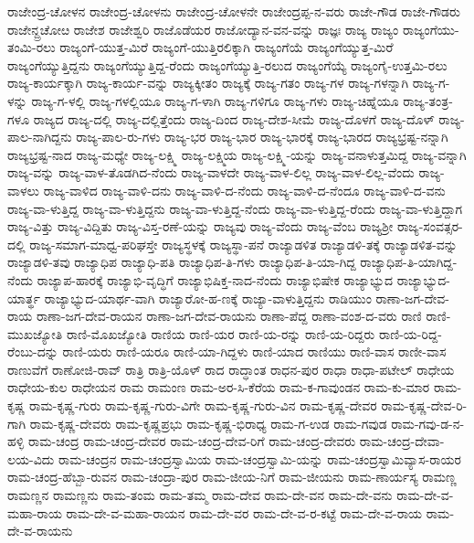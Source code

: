 ರಾಜೇಂದ್ರ-ಚೋಳನ
ರಾಜೇಂದ್ರ-ಚೋಳನು
ರಾಜೇಂದ್ರ-ಚೋಳನೇ
ರಾಜೇಂದ್ರಪ್ಪ-ನ-ವರು
ರಾಜೇ-ಗೌಡ
ರಾಜೇ-ಗೌಡರು
ರಾಜೇನ್ದ್ರಚೋೞ
ರಾಜೇಶ
ರಾಜೇಶ್ವರಿ
ರಾಜೊಡೆಯರ
ರಾಜೋದ್ಯಾನ-ವನ-ವನ್ನು
ರಾಜ್ಞಃ
ರಾಜ್ಯ
ರಾಜ್ಯಂ
ರಾಜ್ಯಂಗೆಯು-ತಂಮಿ-ರಲು
ರಾಜ್ಯಂಗೆ-ಯುತ್ತ-ಮಿರೆ
ರಾಜ್ಯಂಗೆ-ಯುತ್ತಿರಲಿಕ್ಕಾಗಿ
ರಾಜ್ಯಂಗೆಯೆ
ರಾಜ್ಯಂಗೆಯ್ಯುತ್ತ-ಮಿರೆ
ರಾಜ್ಯಂಗೆಯ್ಯುತ್ತಿದ್ದನು
ರಾಜ್ಯಂಗೆಯ್ಯುತ್ತಿದ್ದ-ರೆಂದು
ರಾಜ್ಯಂಗೆಯ್ಯುತ್ತಿ-ರಲುದ
ರಾಜ್ಯಂಗೆಯ್ಯೆ
ರಾಜ್ಯಂಗೈ-ಉತ್ತಮಿ-ರಲು
ರಾಜ್ಯ-ಕಾರ್ಯಕ್ಕಾಗಿ
ರಾಜ್ಯ-ಕಾರ್ಯ-ವನ್ನು
ರಾಜ್ಯಕ್ಕೀತಂ
ರಾಜ್ಯಕ್ಕೆ
ರಾಜ್ಯ-ಗತಂ
ರಾಜ್ಯ-ಗಳ
ರಾಜ್ಯ-ಗಳನ್ನಾಗಿ
ರಾಜ್ಯ-ಗ-ಳನ್ನು
ರಾಜ್ಯ-ಗ-ಳಲ್ಲಿ
ರಾಜ್ಯ-ಗಳಲ್ಲಿಯೂ
ರಾಜ್ಯ-ಗ-ಳಾಗಿ
ರಾಜ್ಯ-ಗಳಿಗೂ
ರಾಜ್ಯ-ಗಳು
ರಾಜ್ಯ-ಚಿಹ್ನೆಯೂ
ರಾಜ್ಯ-ತಂತ್ರ-ಗಳೂ
ರಾಜ್ಯದ
ರಾಜ್ಯ-ದಲ್ಲಿ
ರಾಜ್ಯ-ದಲ್ಲಿತ್ತೆಂದು
ರಾಜ್ಯ-ದಿಂದ
ರಾಜ್ಯ-ದೇಶ-ಸೀಮೆ
ರಾಜ್ಯ-ದೊಳಗೆ
ರಾಜ್ಯ-ದೊಳ್
ರಾಜ್ಯ-ಪಾಲ-ನಾಗಿದ್ದನು
ರಾಜ್ಯ-ಪಾಲ-ರು-ಗಳು
ರಾಜ್ಯ-ಭರ
ರಾಜ್ಯ-ಭಾರ
ರಾಜ್ಯ-ಭಾರಕ್ಕೆ
ರಾಜ್ಯ-ಭಾರದ
ರಾಜ್ಯಭ್ರಷ್ಟ-ನನ್ನಾಗಿ
ರಾಜ್ಯಭ್ರಷ್ಟ-ನಾದ
ರಾಜ್ಯ-ಮಧ್ಯೇ
ರಾಜ್ಯ-ಲಕ್ಷ್ಮಿ
ರಾಜ್ಯ-ಲಕ್ಷ್ಮಿಯ
ರಾಜ್ಯ-ಲಕ್ಷ್ಮಿ-ಯನ್ನು
ರಾಜ್ಯ-ವನಾಳುತ್ತಮಿದ್ದ
ರಾಜ್ಯ-ವನ್ನಾಗಿ
ರಾಜ್ಯ-ವನ್ನು
ರಾಜ್ಯ-ವಾಳ-ತೊಡಗಿದ-ನೆಂದು
ರಾಜ್ಯ-ವಾಳದೇ
ರಾಜ್ಯ-ವಾಳ-ಲಿಲ್ಲ
ರಾಜ್ಯ-ವಾಳ-ಲಿಲ್ಲ-ವೆಂದು
ರಾಜ್ಯ-ವಾಳಲು
ರಾಜ್ಯ-ವಾಳಿದ
ರಾಜ್ಯ-ವಾಳಿ-ದನು
ರಾಜ್ಯ-ವಾಳಿ-ದ-ನೆಂದು
ರಾಜ್ಯ-ವಾಳಿ-ದ-ನೆಂದೂ
ರಾಜ್ಯ-ವಾಳಿ-ದ-ವನು
ರಾಜ್ಯ-ವಾ-ಳುತ್ತಿದ್ದ
ರಾಜ್ಯ-ವಾ-ಳುತ್ತಿದ್ದನು
ರಾಜ್ಯ-ವಾ-ಳುತ್ತಿದ್ದ-ನೆಂದು
ರಾಜ್ಯ-ವಾ-ಳುತ್ತಿದ್ದ-ರೆಂದು
ರಾಜ್ಯ-ವಾ-ಳುತ್ತಿದ್ದಾಗ
ರಾಜ್ಯ-ವಿತ್ತು
ರಾಜ್ಯ-ವಿದ್ದಿತು
ರಾಜ್ಯ-ವಿಸ್ತ-ರಣೆ-ಯನ್ನು
ರಾಜ್ಯವು
ರಾಜ್ಯ-ವೆಂದು
ರಾಜ್ಯ-ವೆಂಬ
ರಾಜ್ಯಶ್ರೀ
ರಾಜ್ಯ-ಸಂವತ್ಸರ-ದಲ್ಲಿ
ರಾಜ್ಯ-ಸಮಾಗ-ಮಾಧ್ವ-ಪರಿಘಸ್ತೇ
ರಾಜ್ಯಸ್ಥಳಕ್ಕೆ
ರಾಜ್ಯಸ್ಥಾ-ಪನೆ
ರಾಜ್ಯಾಡಳಿತ
ರಾಜ್ಯಾಡಳಿ-ತಕ್ಕೆ
ರಾಜ್ಯಾಡಳಿತ-ವನ್ನು
ರಾಜ್ಯಾಡಳಿ-ತವು
ರಾಜ್ಯಾಧಿಪ
ರಾಜ್ಯಾಧಿ-ಪತಿ
ರಾಜ್ಯಾಧಿಪ-ತಿ-ಗಳು
ರಾಜ್ಯಾಧಿಪ-ತಿ-ಯಾ-ಗಿದ್ದ
ರಾಜ್ಯಾಧಿಪ-ತಿ-ಯಾಗಿದ್ದ-ನೆಂದು
ರಾಜ್ಯಾಪ-ಹಾರಕ್ಕೆ
ರಾಜ್ಯಾಭಿ-ವೃದ್ಧಿಗೆ
ರಾಜ್ಯಾಭಿಷಿಕ್ತ-ನಾದ-ನೆಂದು
ರಾಜ್ಯಾಭಿಷೇಕ
ರಾಜ್ಯಾಭ್ಯುದ
ರಾಜ್ಯಾಭ್ಯುದ-ಯಾರ್ತ್ಥ
ರಾಜ್ಯಾಭ್ಯುದ-ಯಾರ್ಥ-ವಾಗಿ
ರಾಜ್ಯಾರೋ-ಹ-ಣಕ್ಕೆ
ರಾಜ್ಯಾ-ವಾಳುತ್ತಿದ್ದನು
ರಾಡಿಯುಂ
ರಾಣಾ-ಜಗ-ದೇವ-ರಾಯ
ರಾಣಾ-ಜಗ-ದೇವ-ರಾಯನ
ರಾಣಾ-ಜಗ-ದೇವ-ರಾಯನು
ರಾಣಾ-ಪೆದ್ದ
ರಾಣಾ-ವಂಶ-ದ-ವರು
ರಾಣಿ
ರಾಣಿ-ಮುಖಜ್ಯೋತಿ
ರಾಣಿ-ಮೊಖಜ್ಯೋತಿ
ರಾಣಿಯ
ರಾಣಿ-ಯರ
ರಾಣಿ-ಯ-ರನ್ನು
ರಾಣಿ-ಯ-ರಿದ್ದರು
ರಾಣಿ-ಯ-ರಿದ್ದ-ರೆಂಬು-ದನ್ನು
ರಾಣಿ-ಯರು
ರಾಣಿ-ಯರೂ
ರಾಣಿ-ಯಾ-ಗಿದ್ದಳು
ರಾಣಿ-ಯಾದ
ರಾಣಿಯು
ರಾಣಿ-ವಾಸ
ರಾಣೀ-ವಾಸ
ರಾಣುವೆಗೆ
ರಾಣೋಜಿ-ರಾವ್
ರಾತ್ರಿ
ರಾತ್ರಿ-ಯೊಳ್
ರಾದ
ರಾದ್ಧಾಂತ
ರಾಧನ-ಪುರ
ರಾಧಾ
ರಾಧಾ-ಪಟೇಲ್
ರಾಧೇಯ
ರಾಧೇಯ-ಕುಲ
ರಾಧೇಯನ
ರಾಮ
ರಾಮಂಣ
ರಾಮ-ಅರ-ಸಿ-ಕೆರೆಯ
ರಾಮ-ಕ-ಗಾವುಂಡನ
ರಾಮ-ಕು-ಮಾರ
ರಾಮ-ಕೃಷ್ಣ
ರಾಮ-ಕೃಷ್ಣ-ಗುರು
ರಾಮ-ಕೃಷ್ಣ-ಗುರು-ವಿಗೇ
ರಾಮ-ಕೃಷ್ಣ-ಗುರು-ವಿನ
ರಾಮ-ಕೃಷ್ಣ-ದೇವರ
ರಾಮ-ಕೃಷ್ಣ-ದೇವ-ರಿ-ಗಾಗಿ
ರಾಮ-ಕೃಷ್ಣ-ದೇವರು
ರಾಮ-ಕೃಷ್ಣಪ್ರಭು
ರಾಮ-ಕೃಷ್ಣ-ಭಿರಾಧ್ಯ
ರಾಮ-ಗ-ಉಡ
ರಾಮ-ಗವುಡ
ರಾಮ-ಗವು-ಡ-ನ-ಹಳ್ಳಿ
ರಾಮ-ಚಂದ್ರ
ರಾಮ-ಚಂದ್ರ-ದೇವರ
ರಾಮ-ಚಂದ್ರ-ದೇವ-ರಿಗೆ
ರಾಮ-ಚಂದ್ರ-ದೇವರು
ರಾಮ-ಚಂದ್ರ-ದೇವಾ-ಲಯ-ವಿದು
ರಾಮ-ಚಂದ್ರನ
ರಾಮ-ಚಂದ್ರಸ್ವಾಮಿಯ
ರಾಮ-ಚಂದ್ರಸ್ವಾಮಿ-ಯನ್ನು
ರಾಮ-ಚಂದ್ರಸ್ವಾಮಿವ್ಯಾಸ-ರಾಯರ
ರಾಮ-ಚಂದ್ರ-ಹೆಬ್ಬಾ-ರುವನ
ರಾಮ-ಚಂದ್ರಾ-ಪುರ
ರಾಮ-ಜೀಯ-ನಿಗೆ
ರಾಮ-ಜೀಯನು
ರಾಮ-ಣಾರ್ಯಸ್ಯ
ರಾಮಣ್ಣ
ರಾಮಣ್ಣನ
ರಾಮಣ್ಣನು
ರಾಮ-ತಂಮ
ರಾಮ-ತಮ್ಮ
ರಾಮ-ದೇವ
ರಾಮ-ದೇ-ವನ
ರಾಮ-ದೇ-ವನು
ರಾಮ-ದೇ-ವ-ಮಹಾ-ರಾಯ
ರಾಮ-ದೇ-ವ-ಮಹಾ-ರಾಯನ
ರಾಮ-ದೇ-ವರ
ರಾಮ-ದೇ-ವ-ರ-ಕಟ್ಟೆ
ರಾಮ-ದೇ-ವ-ರಾಯ
ರಾಮ-ದೇ-ವ-ರಾಯನು

